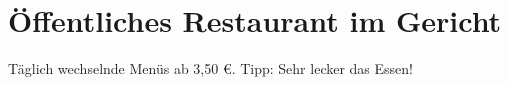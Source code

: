 \section{Öffentliches Restaurant im Gericht }
Täglich wechselnde  Menüs ab 3,50 \euro. Tipp: Sehr lecker das Essen!